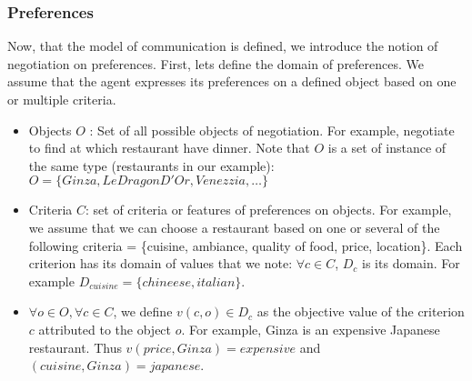 \documentclass{llncs}
\begin{document}
\subsubsection{Preferences}
\par Now, that  the model of communication is defined, we introduce the notion of negotiation on preferences. First, lets define the domain of preferences. We assume that the agent expresses its preferences on a defined object based on one or multiple criteria.   
 \begin{itemize}
 \item Objects $O$ : Set of all possible objects of negotiation. For example, negotiate to find at which restaurant have dinner. Note that $O$ is a set of instance of the same type (restaurants in our example): $O=\{Ginza, LeDragonD'Or, Venezzia, \ldots\}$
 \item Criteria $C$: set of criteria or features of preferences on objects. For example, we assume that we can choose a restaurant based on one or several of the following criteria = \{cuisine, ambiance, quality of food, price, location\}. Each criterion has its domain of values that we note: $\forall c \in C$, $D_{c}$ is its domain. For example $D_{cuisine} = \{chineese, italian\}$.

 \item $\forall o \in O, \forall c \in C$, we define $v(c,o) \in D_{c}$ as the objective value of the criterion $c$ attributed to the object $o$. For example, Ginza is an expensive Japanese restaurant. Thus $v(price, Ginza) = expensive$ and $(cuisine, Ginza) = japanese$. 
 

\end{itemize}
\end{document}
